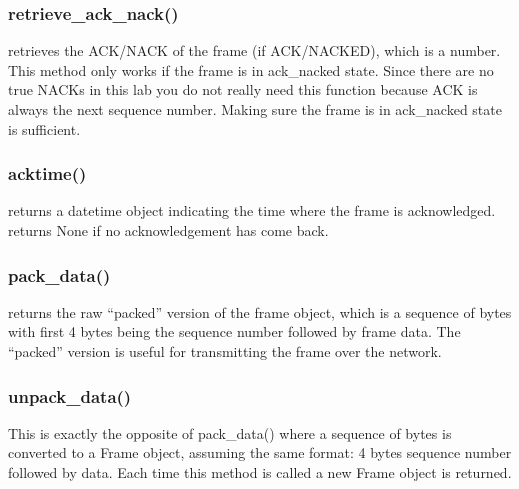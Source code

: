 \documentclass[11pt]{article}
\begin{document}
\subsubsection{retrieve\_ack\_nack()}
retrieves the ACK/NACK of the frame (if ACK/NACKED), which is a number. This method only works if the frame is in ack\_nacked state. Since there are no true NACKs in this lab you do not really need this function because ACK is always the next sequence number. Making sure the frame is in ack\_nacked state is sufficient.

\subsubsection{acktime()}
returns a datetime object indicating the time where the frame is acknowledged. returns None if no acknowledgement has come back.

\subsubsection{pack\_data()}
returns the raw ``packed'' version of the frame object, which is a sequence of bytes with first 4 bytes being the sequence number followed by frame data. The ``packed'' version is useful for transmitting the frame over the network.

\subsubsection{unpack\_data()}
This is exactly the opposite of pack\_data() where a sequence of bytes is converted to a Frame object, assuming the same format: 4 bytes sequence number followed by data. Each time this method is called a new Frame object is returned.
\end{document}
